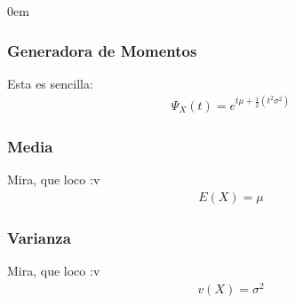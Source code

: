 \documentclass[12pt, fleqn]{report}                             %
\newenvironment{SmallIndentation}[1][0.75em]                    %
        {\begin{adjustwidth}{#1}{}\begin{footnotesize}}             %
        {\end{footnotesize}\end{adjustwidth}}                       %
\theoremstyle{break}                                            %
\begin{document}
\begin{multicols}{2}
\begin{SmallIndentation}[0em]
                    \subsubsection{Generadora de Momentos}

                        Esta es sencilla:
                        \begin{align*}
                            \Psi_X(t) = e^{t\mu + \frac{1}{2}(t^2\sigma^2)}
                        \end{align*}



                    \subsubsection{Media}

                        Mira, que loco :v
                        \begin{align*}
                            E(X) = \mu
                        \end{align*}

                            
                    \subsubsection{Varianza}

                        Mira, que loco :v
                        \begin{align*}
                            v(X) = \sigma^2
                        \end{align*}



\end{SmallIndentation}
\end{multicols}
\end{document}

